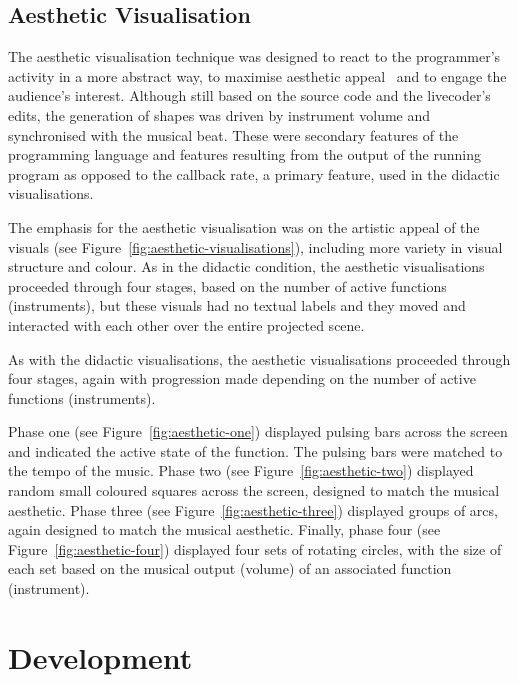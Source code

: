 

\subsection{Aesthetic Visualisation}
\label{sec:aesthetic-visualisation}

The aesthetic visualisation technique was designed to react to the programmer's activity in a more abstract way, to maximise aesthetic appeal~\cite{Cawthon2007} and to engage the audience's interest. Although still based on the source code and the livecoder's edits, the generation of shapes was driven by instrument volume and synchronised with the musical beat. These were secondary features of the programming language and features resulting from the output of the running program as opposed to the callback rate, a primary feature, used in the didactic visualisations.

The emphasis for the aesthetic visualisation was on the artistic appeal of the visuals (see Figure~\ref{fig:aesthetic-visualisations}), including more variety in visual structure and colour. As in the didactic condition, the aesthetic visualisations proceeded through four stages, based on the number of active functions (instruments), but these visuals had no textual labels and they moved and interacted with each other over the entire projected scene.

As with the didactic visualisations, the aesthetic visualisations proceeded through four stages, again with progression made depending on the number of active functions (instruments).

Phase one (see Figure~\ref{fig:aesthetic-one}) displayed pulsing bars across the screen and indicated the active state of the function. The pulsing bars were matched to the tempo of the music. Phase two (see Figure~\ref{fig:aesthetic-two}) displayed random small coloured squares across the screen, designed to match the musical aesthetic. Phase three (see Figure~\ref{fig:aesthetic-three}) displayed groups of arcs, again designed to match the musical aesthetic. Finally, phase four (see Figure~\ref{fig:aesthetic-four}) displayed four sets of rotating circles, with the size of each set based on the musical output (volume) of an associated function (instrument).

\section{Development}

